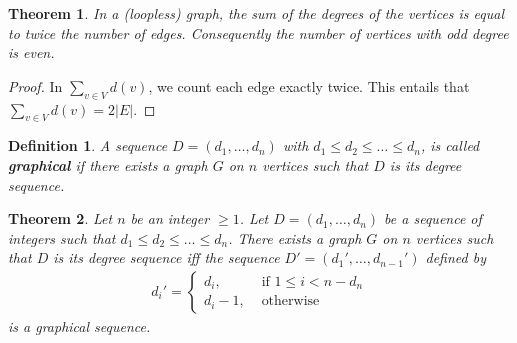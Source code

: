 \documentclass[12pt,a4paper]{article}
\newtheorem{thm}{Theorem}[section]
\newtheorem{defn}{Definition}[section]
\theoremstyle{definition}
\begin{document}
\begin{thm} In a (loopless) graph, the sum of the degrees of the vertices is equal to twice the number of edges. Consequently the number of vertices with odd degree is even. 
\end{thm}
\begin{proof}
In $\sum_{v \in V} d(v)$, we count each edge exactly twice. This entails that  $\sum_{v \in V} d(v) = 2 |E|$.
\end{proof}
\begin{defn} A sequence $D=(d_1, \dots , d_n)$ with $d_1 \leq d_2 \leq \dots \leq d_n$, is called \textbf{graphical} if there exists a graph $G$ on $n$ vertices such that $D$ is its degree sequence. 
\end{defn}
\begin{thm} Let $n$ be an integer $\geq 1$. Let $D=(d_1, \dots , d_n)$ be a sequence of integers such that $d_1 \leq d_2 \leq \dots \leq d_n$. There exists a graph $G$ on $n$ vertices such that $D$ is its degree sequence iff the sequence $D'=(d_1', \dots , d_{n-1}')$ defined by
\begin{align*}
d_i' = \begin{cases} d_i, & \text{ if } 1 \leq i < n -d_n \\ d_i-1, & \text{ otherwise}\end{cases}
\end{align*}
is a graphical sequence. 
\end{thm}
\end{document}
